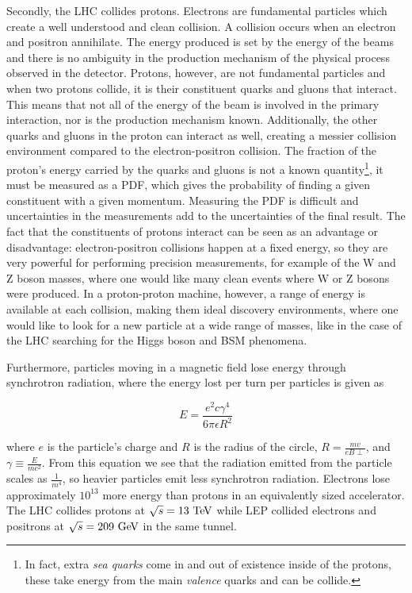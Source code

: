 Secondly, the \ac{LHC} collides protons. Electrons are fundamental particles which create a well understood and clean collision. A collision occurs when an electron and positron annihilate. The energy produced is set by the energy of the beams and there is no ambiguity in the production mechanism of the physical process observed in the detector. Protons, however, are not fundamental particles and when two protons collide, it is their constituent quarks and gluons that interact. This means that not all of the energy of the beam is involved in the primary interaction, nor is the production mechanism known. Additionally, the other quarks and gluons in the proton can interact as well, creating a messier collision environment compared to the electron-positron collision. The fraction of the proton's energy carried by the quarks and gluons is not a known quantity\footnote{In fact, extra \emph{sea quarks} come in and out of existence inside of the protons, these take energy from the main \emph{valence} quarks and can be collide.}, it must be measured as a \acf{PDF}, which gives the probability of finding a given constituent with a given momentum. Measuring the \ac{PDF} is difficult and uncertainties in the measurements add to the uncertainties of the final result. The fact that the constituents of protons interact can be seen as an advantage or disadvantage: electron-positron collisions happen at a fixed energy, so they are very powerful for performing precision measurements, for example of the W and Z boson masses, where one would like many clean events where W or Z bosons were produced. In a proton-proton machine, however, a range of energy is available at each collision, making them ideal discovery environments, where one would like to look for a new particle at a wide range of masses, like in the case of the \ac{LHC} searching for the Higgs boson and \ac{BSM} phenomena.

Furthermore, particles moving in a magnetic field lose energy through synchrotron radiation, where the energy lost per turn per particles is given as

\begin{equation}
E = \frac{e^2c\gamma^4}{6\pi\epsilon R^2}
\end{equation}

where $e$ is the particle's charge and $R$ is the radius of the circle, $R=\frac{mv}{eB\perp}$, and $\gamma \equiv \frac{E}{mc^2}$. From this equation we see that the radiation emitted from the particle scales as $\frac{1}{m^4}$, so heavier particles emit less synchrotron radiation. Electrons lose approximately $10^{13}$ more energy than protons in an equivalently sized accelerator. The \ac{LHC} collides protons at $\sqrt{s} = 13 \TeV$ while \ac{LEP} collided electrons and positrons at $\sqrt{s} = 209 \GeV$ in the same tunnel.


